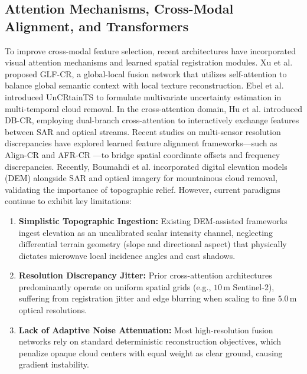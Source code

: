 \subsection{Attention Mechanisms, Cross-Modal Alignment, and Transformers}
To improve cross-modal feature selection, recent architectures have incorporated visual attention mechanisms \cite{vaswani2017attention} and learned spatial registration modules. Xu et al. \cite{xu2022glf} proposed GLF-CR, a global-local fusion network that utilizes self-attention to balance global semantic context with local texture reconstruction. Ebel et al. \cite{ebel2023uncrtaints} introduced UnCRtainTS to formulate multivariate uncertainty estimation in multi-temporal cloud removal. In the cross-attention domain, Hu et al. \cite{hu2025dbcr} introduced DB-CR, employing dual-branch cross-attention to interactively exchange features between SAR and optical streams. Recent studies on multi-sensor resolution discrepancies have explored learned feature alignment frameworks—such as Align-CR \cite{xu2023multimodal} and AFR-CR \cite{zhou2026afrcr}—to bridge spatial coordinate offsets and frequency discrepancies. Recently, Boumahdi et al. \cite{boumahdi2025multimodal} incorporated digital elevation models (DEM) alongside SAR and optical imagery for mountainous cloud removal, validating the importance of topographic relief. However, current paradigms continue to exhibit key limitations:
\begin{enumerate}
    \item \textbf{Simplistic Topographic Ingestion:} Existing DEM-assisted frameworks ingest elevation as an uncalibrated scalar intensity channel, neglecting differential terrain geometry (slope and directional aspect) that physically dictates microwave local incidence angles and cast shadows.
    \item \textbf{Resolution Discrepancy Jitter:} Prior cross-attention architectures predominantly operate on uniform spatial grids (e.g., $10\,\text{m}$ Sentinel-2), suffering from registration jitter and edge blurring when scaling to fine $5.0\,\text{m}$ optical resolutions.
    \item \textbf{Lack of Adaptive Noise Attenuation:} Most high-resolution fusion networks rely on standard deterministic reconstruction objectives, which penalize opaque cloud centers with equal weight as clear ground, causing gradient instability.
\end{enumerate}

